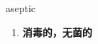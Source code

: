 
\begin{frame}
{\huge aseptic}
\begin{center}
\begin{enumerate}\Large
  \item \textbf{消毒的，无菌的}
\end{enumerate}
\end{center}
\end{frame}
